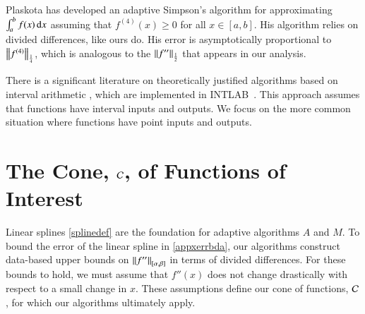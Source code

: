 \documentclass[review]{elsarticle}
\theoremstyle{definition}
\begin{document}
Plaskota \cite{Pla15a} has developed an adaptive Simpson's algorithm for
approximating $\int_a^b f(x) \, \dif x$ assuming that $f^{(4)}(x) \ge 0$ for all
$x \in [a,b]$. His algorithm relies on divided differences, like ours do. His
error is asymptotically proportional to $\norm[\frac14]{f^{(4)}}$, which is
analogous to the $\norm[\frac12]{f''}$ that appears in our analysis.

There is a significant literature on theoretically justified algorithms based on
interval arithmetic \cite{MoKeCl09, Rum10a}, which are implemented in
INTLAB~\cite{Rum99a}. This approach assumes that functions have interval inputs
and outputs. We focus on the more common situation where functions have point
inputs and outputs.

\section{The Cone, $\cc$, of Functions of Interest} \label{sec:cone}

Linear splines \eqref{splinedef} are the foundation for adaptive algorithms $A$
and $M$. To bound the error of the linear spline in \eqref{appxerrbda}, our
algorithms construct data-based upper bounds on $\norm[{[\alpha, \beta]}]{f''}$
in terms of divided differences. For these bounds to hold, we must assume that
$f''(x)$ does not change drastically with respect to a small change in $x$.
These assumptions define our cone of functions, $\cc$, for which our algorithms
ultimately apply.
\end{document}
